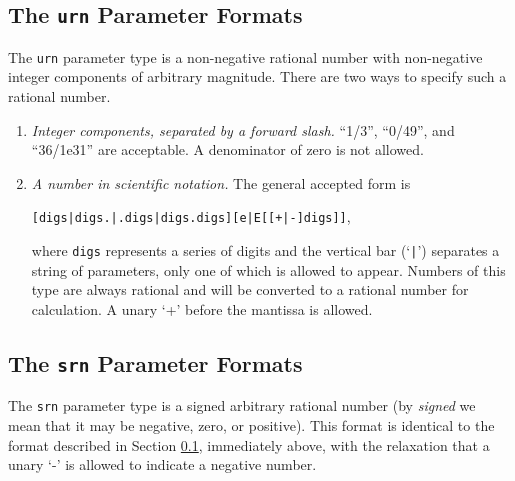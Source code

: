 \subsection{The \texttt{urn} Parameter Formats}
\label{ctin0:sccl0:surn0}

The \texttt{urn} parameter type is a non-negative rational number with
non-negative integer components of arbitrary magnitude.  
There are two ways to specify such a rational
number.

\begin{enumerate}
\item \emph{Integer components, separated by a forward slash.}
      ``1/3'', ``0/49'', and ``36/1e31'' are acceptable.  A denominator
      of zero is not allowed.
\item \emph{A number in scientific notation.}  The general accepted
      form is

      \texttt{[digs|digs.|.digs|digs.digs][e|E[[+|-]digs]]},

      where \texttt{digs} represents a series of digits and the 
      vertical bar (`\texttt{|}') separates a string of parameters,
      only one of which is allowed to appear.  Numbers of this
      type are always rational and will be converted to a rational
      number for calculation.  A unary `+' before the mantissa is allowed.
\end{enumerate}


\subsection{The \texttt{srn} Parameter Formats}
\label{ctin0:sccl0:ssrn0}

The \texttt{srn} parameter type is a signed arbitrary rational number
(by \emph{signed} we mean that it may be negative, zero, or positive).
This format is identical to the format
described in Section \ref{ctin0:sccl0:surn0}, immediately above,
with the relaxation that a unary `-' is allowed to indicate a 
negative number.


